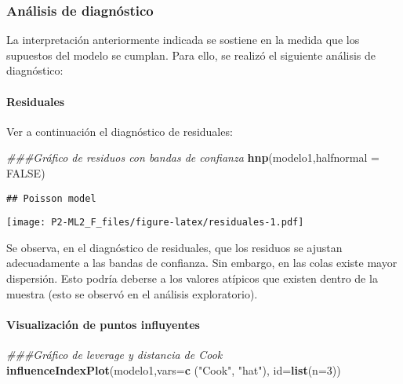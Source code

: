 \documentclass[]{article}
\newenvironment{Shaded}{\begin{snugshade}}{\end{snugshade}}
\newcommand{\CommentTok}[1]{\textcolor[rgb]{0.56,0.35,0.01}{\textit{#1}}}
\newcommand{\DataTypeTok}[1]{\textcolor[rgb]{0.13,0.29,0.53}{#1}}
\newcommand{\DecValTok}[1]{\textcolor[rgb]{0.00,0.00,0.81}{#1}}
\newcommand{\KeywordTok}[1]{\textcolor[rgb]{0.13,0.29,0.53}{\textbf{#1}}}
\newcommand{\NormalTok}[1]{#1}
\newcommand{\OtherTok}[1]{\textcolor[rgb]{0.56,0.35,0.01}{#1}}
\newcommand{\StringTok}[1]{\textcolor[rgb]{0.31,0.60,0.02}{#1}}
\let\oldparagraph\paragraph
\renewcommand{\paragraph}[1]{\oldparagraph{#1}\mbox{}}
\begin{document}
\hypertarget{anuxe1lisis-de-diagnuxf3stico}{%
\subsubsection{Análisis de
diagnóstico}\label{anuxe1lisis-de-diagnuxf3stico}}

La interpretación anteriormente indicada se sostiene en la medida que
los supuestos del modelo se cumplan. Para ello, se realizó el siguiente
análisis de diagnóstico:

\hypertarget{residuales}{%
\paragraph{Residuales}\label{residuales}}

Ver a continuación el diagnóstico de residuales:

\begin{Shaded}
\begin{Highlighting}[]
\CommentTok{\#\#\#Gráfico de residuos con bandas de confianza}
\KeywordTok{hnp}\NormalTok{(modelo1,}\DataTypeTok{halfnormal =} \OtherTok{FALSE}\NormalTok{)}
\end{Highlighting}
\end{Shaded}

\begin{verbatim}
## Poisson model
\end{verbatim}

\texttt{[image: P2-ML2\_F\_files/figure-latex/residuales-1.pdf]}

Se observa, en el diagnóstico de residuales, que los residuos se ajustan
adecuadamente a las bandas de confianza. Sin embargo, en las colas
existe mayor dispersión. Esto podría deberse a los valores atípicos que
existen dentro de la muestra (esto se observó en el análisis
exploratorio).

\hypertarget{visualizaciuxf3n-de-puntos-influyentes}{%
\paragraph{Visualización de puntos
influyentes}\label{visualizaciuxf3n-de-puntos-influyentes}}

\begin{Shaded}
\begin{Highlighting}[]
\CommentTok{\#\#\#Gráfico de leverage y distancia de Cook}
\KeywordTok{influenceIndexPlot}\NormalTok{(modelo1,}\DataTypeTok{vars=}\KeywordTok{c}\NormalTok{ (}\StringTok{"Cook"}\NormalTok{, }\StringTok{"hat"}\NormalTok{), }\DataTypeTok{id=}\KeywordTok{list}\NormalTok{(}\DataTypeTok{n=}\DecValTok{3}\NormalTok{))}
\end{Highlighting}
\end{Shaded}
\end{document}
